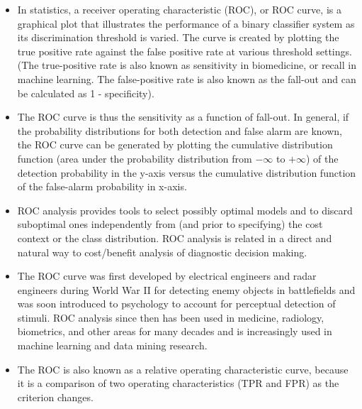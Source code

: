 \documentclass[a4paper,12pt]{article}
\begin{document}
\begin{itemize}
	\item In statistics, a receiver operating characteristic (ROC), or ROC curve, is a graphical plot that illustrates the performance of a binary classifier system as its discrimination threshold is varied. The curve is created by plotting the true positive rate against the false positive rate at various threshold settings. (The true-positive rate is also known as sensitivity in biomedicine, or recall in machine learning. The false-positive rate is also known as the fall-out and can be calculated as 1 - specificity). 
	
	\item The ROC curve is thus the sensitivity as a function of fall-out. In general, if the probability distributions for both detection and false alarm are known, the ROC curve can be generated by plotting the cumulative distribution function (area under the probability distribution from $-\infty$ to $+\infty$) of the detection probability in the y-axis versus the cumulative distribution function of the false-alarm probability in x-axis.
	
	\item ROC analysis provides tools to select possibly optimal models and to discard suboptimal ones independently from (and prior to specifying) the cost context or the class distribution. ROC analysis is related in a direct and natural way to cost/benefit analysis of diagnostic decision making.
	
	\item The ROC curve was first developed by electrical engineers and radar engineers during World War II for detecting enemy objects in battlefields and was soon introduced to psychology to account for perceptual detection of stimuli. ROC analysis since then has been used in medicine, radiology, biometrics, and other areas for many decades and is increasingly used in machine learning and data mining research.
	

	\item The ROC is also known as a relative operating characteristic curve, because it is a comparison of two operating characteristics (TPR and FPR) as the criterion changes.









\end{itemize}
\end{document}
